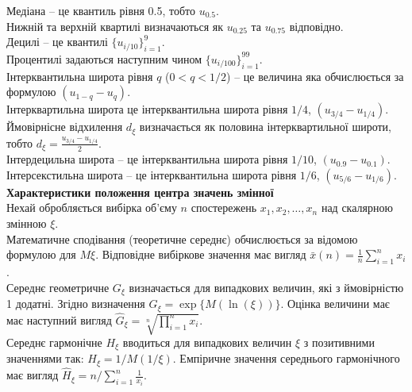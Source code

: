 Медіана -- це квантиль рівня 0.5, тобто $u_{0.5}$. \\

Нижній та верхній квартилі визначаються як $u_{0.25}$ та $u_{0.75}$ відповідно. \\

Децилі -- це квантилі $\{ u_{i/10} \}_{i=1}^9$. \\

Процентилі задаються наступним чином $\{ u_{i/100} \}_{i=1}^{99}$. \\

Інтерквантильна широта рівня $q$ ($0 < q < 1 /2$) -- це величина яка обчислюється за формулою $(u_{1 - q} - u_q)$. \\

Інтерквартильна широта це інтерквантильна широта рівня $1/4$, $(u_{3/4} - u_{1/4})$. \\

Ймовірнісне відхилення $d_\xi$ визначається як половина інтерквартильної широти, тобто $d_\xi = \frac{u_{3/4} - u_{1/4}}{2}$. \\

Інтердецильна широта -- це інтерквантильна широта рівня $1 / 10$, $(u_{0.9} - u_{0.1})$. \\

Інтерсекстильна широта -- це інтерквантильна широта рівня $1 / 6$, $(u_{5/6} - u_{1/6})$. \\

\textbf{Характеристики положення центра значень змінної} \\

Нехай обробляється вибірка об'єму $n$ спостережень $x_1, x_2, \ldots, x_n$ над скалярною змінною $\xi$. \\

Математичне сподівання (теоретичне середнє) обчислюється за відомою формулою для $M \xi$. Відповідне вибіркове значення має вигляд $\bar{x}(n)= \frac{1}{n} \sum_{i=1}^n x_i$. \\

Середнє геометричне $G_\xi$ визначається для випадкових величин, які з ймовірністю 1 додатні. Згідно визначення $G_\xi = \exp\{M (\ln (\xi))\}$. Оцінка величини має має наступний вигляд $\widehat{G}_\xi = \sqrt[n]{\prod_{i=1}^n x_i}$. \\

Середнє гармонічне $H_\xi$ вводиться для випадкових величин $\xi$ з позитивними значеннями так: $H_\xi = 1 / M(1 / \xi)$. Емпіричне значення середнього гармонічного має вигляд $\widehat{H}_\xi = n / \sum_{i=1}^n \frac{1}{x_i}$. \\

